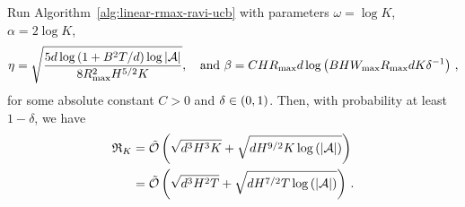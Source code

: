 \begin{theorem} \label{thm:main-full}
    Run Algorithm~\ref{alg:linear-rmax-ravi-ucb} with parameters $\omega = \log K$, $\alpha = 2 \log K$,
    \begin{align*}
        \eta = \sqrt{\frac{5 d \log \left( 1 + B^2 T / d \right) \log \left|\mathcal{A}\right|}{8 R_{\max}^2 H^{5 / 2} K}}, \quad\text{and } \beta = C H R_{\max} d \log \left( B H W_{\max} R_{\max} d K \delta^{-1} \right)\,,
    \end{align*}
    for some absolute constant $C > 0$ and $\delta \in \left( 0, 1 \right)$. Then, with probability at least $1 - \delta$, we have
    \begin{align*}
        \mathfrak{R}_K &= \tilde{\mathcal{O}} \left( \sqrt{d^3 H^3 K} + \sqrt{d H^{9/2} K \log \left( \left|\mathcal{A}\right| \right)} \right) \\
        &= \tilde{\mathcal{O}} \left( \sqrt{d^3 H^2 T} + \sqrt{d H^{7/2} T \log \left( \left|\mathcal{A}\right| \right)} \right)\,.
    \end{align*}
\end{theorem}

